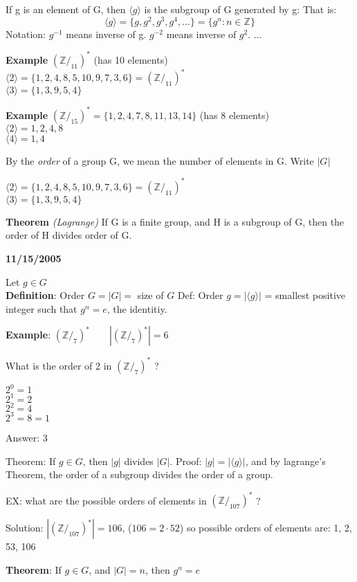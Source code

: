 If g is an element of G, then $\langle g\rangle$ is the subgroup of G generated by g: That is:
\[
\langle g\rangle = \{g,g^2,g^3,g^4,\ldots\} = \{g^n: n \in \mathbb{Z}\}
\]
Notation: $g^{-1}$ means inverse of g. $g^{-2}$ means inverse of $g^2$. $\ldots$

\textbf{Example} $(\mathbb{Z}/_{11})^*$ (has 10 elements)\\
$\langle 2\rangle = \{1,2,4,8,5,10,9,7,3,6\} = (\mathbb{Z}/_{11})^*$\\
$\langle 3\rangle = \{1,3,9,5,4\}$

\textbf{Example} $(\mathbb{Z}/_{15})^* = \{1,2,4,7,8,11,13,14\}$ (has 8 elements)\\
$\langle 2\rangle = {1,2,4,8}$\\
$\langle 4\rangle = {1,4}$

By the \textit{order} of a group G, we mean the number of elements in G. Write $|G|$

$\langle 2\rangle = \{1,2,4,8,5,10,9,7,3,6\} = (\mathbb{Z}/_{11})^*$\\
$\langle 3\rangle = \{1,3,9,5,4\}$

\textbf{Theorem} \textit{(Lagrange)} If G is a finite group, and H is a subgroup of G, then the order of H divides order of G.

\textbf{11/15/2005}

Let $g \in G$\\
\textbf{Definition}: Order $G = |G| =$ size of $G$
Def: Order $g = |\langle g\rangle|$ = smallest positive integer such that $g^n = e$, the identitiy.

\textbf{Example}: $(\mathbb{Z}/_7)^*\qquad |(\mathbb{Z}/_7)^*| = 6$

What is the order of 2 in $(\mathbb{Z}/_7)^*$ ?

$2^0 = 1$ \\
$2^1 = 2$ \\ 
$2^2 = 4$ \\
$2^3 = 8 = 1$

Answer: 3

Theorem: If $g \in G$, then $|g|$ divides $|G|$.
Proof: $|g| = |\langle g\rangle|$, and by lagrange's Theorem, the order of a subgroup divides the order of a group.

EX: what are the possible orders of elements in $(\mathbb{Z}/_{107})^*$ ?

Solution: $|(\mathbb{Z}/_{107})^*| = 106$, ($106 = 2\cdot 52$) so possible orders of elements are: 1, 2, 53, 106

\textbf{Theorem}: If $g \in G$, and $|G| = n$, then $g^n = e$

